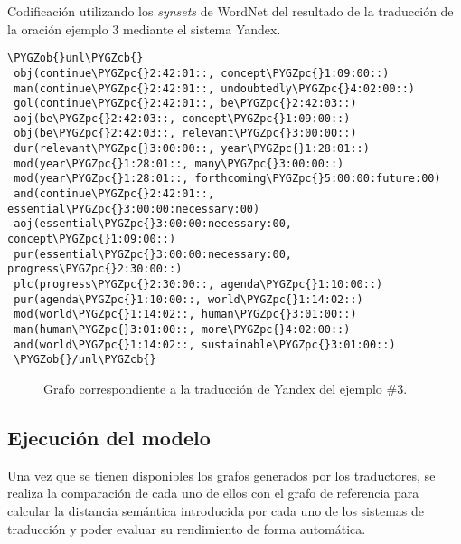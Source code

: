 \documentclass[a4paper,12pt,spanish]{book}
\def\PYGZob{\char`\{}
\def\PYGZcb{\char`\}}
\def\PYGZpc{\char`\%}
\begin{document}
\begin{literal-block}
\caption{Codificación utilizando los \emph{synsets} de WordNet del resultado de la traducción de la oración ejemplo 3 mediante el sistema Yandex.}
\begin{Verbatim}[commandchars=\\\{\}]
 \PYGZob{}unl\PYGZcb{}
 obj(continue\PYGZpc{}2:42:01::, concept\PYGZpc{}1:09:00::)
 man(continue\PYGZpc{}2:42:01::, undoubtedly\PYGZpc{}4:02:00::)
 gol(continue\PYGZpc{}2:42:01::, be\PYGZpc{}2:42:03::)
 aoj(be\PYGZpc{}2:42:03::, concept\PYGZpc{}1:09:00::)
 obj(be\PYGZpc{}2:42:03::, relevant\PYGZpc{}3:00:00::)
 dur(relevant\PYGZpc{}3:00:00::, year\PYGZpc{}1:28:01::)
 mod(year\PYGZpc{}1:28:01::, many\PYGZpc{}3:00:00::)
 mod(year\PYGZpc{}1:28:01::, forthcoming\PYGZpc{}5:00:00:future:00)
 and(continue\PYGZpc{}2:42:01::, essential\PYGZpc{}3:00:00:necessary:00)
 aoj(essential\PYGZpc{}3:00:00:necessary:00, concept\PYGZpc{}1:09:00::)
 pur(essential\PYGZpc{}3:00:00:necessary:00, progress\PYGZpc{}2:30:00::)
 plc(progress\PYGZpc{}2:30:00::, agenda\PYGZpc{}1:10:00::)
 pur(agenda\PYGZpc{}1:10:00::, world\PYGZpc{}1:14:02::)
 mod(world\PYGZpc{}1:14:02::, human\PYGZpc{}3:01:00::)
 man(human\PYGZpc{}3:01:00::, more\PYGZpc{}4:02:00::)
 and(world\PYGZpc{}1:14:02::, sustainable\PYGZpc{}3:01:00::)
 \PYGZob{}/unl\PYGZcb{}
\end{Verbatim}
\label{5.pruebas/index:code-example-yandex-3}
\end{literal-block}
\begin{figure}[htbp]
\centering
\capstart

\caption{Grafo correspondiente a la traducción de Yandex del ejemplo \#3.}\label{5.pruebas/index:sample03-yandex}\end{figure}


\subsection{Ejecución del modelo}
\label{5.pruebas/index:ejecucion-del-modelo}
Una vez que se tienen disponibles los grafos generados por los traductores, se
realiza la comparación de cada uno de ellos con el grafo de referencia para calcular
la distancia semántica introducida por cada uno de los sistemas de traducción y
poder evaluar su rendimiento de forma automática.
\end{document}
